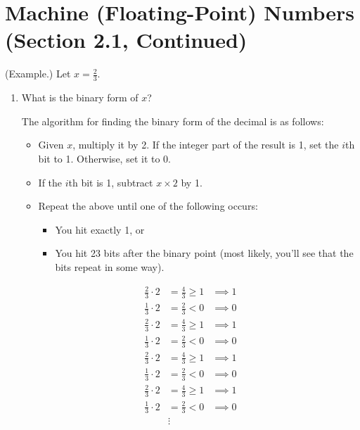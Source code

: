\documentclass[letterpaper]{article}
\begin{document}
\section{Machine (Floating-Point) Numbers (Section 2.1, Continued)}
\begin{mdframed}
    (Example.) Let $x = \frac{2}{3}$. 
    
    \begin{enumerate}[(1)]
        \item What is the binary form of $x$?
        \begin{mdframed}
            The algorithm for finding the binary form of the decimal is as follows: 
            \begin{itemize}
                \item Given $x$, multiply it by 2. If the integer part of the result is 1, set the $i$th bit to 1. Otherwise, set it to 0. 
                \item If the $i$th bit is 1, subtract $x \times 2$ by 1. 
                \item Repeat the above until one of the following occurs: 
                \begin{itemize}
                    \item You hit exactly 1, or 
                    \item You hit 23 bits after the binary point (most likely, you'll see that the bits repeat in some way). 
                \end{itemize}
            \end{itemize}
            \[\begin{aligned}
                \frac{2}{3} \cdot 2 &= \frac{4}{3} \geq 1 &\implies 1 \\ 
                \frac{1}{3} \cdot 2 &= \frac{2}{3} < 0 &\implies 0 \\
                \frac{2}{3} \cdot 2 &= \frac{4}{3} \geq 1 &\implies 1 \\ 
                \frac{1}{3} \cdot 2 &= \frac{2}{3} < 0 &\implies 0 \\
                \frac{2}{3} \cdot 2 &= \frac{4}{3} \geq 1 &\implies 1 \\ 
                \frac{1}{3} \cdot 2 &= \frac{2}{3} < 0 &\implies 0 \\
                \frac{2}{3} \cdot 2 &= \frac{4}{3} \geq 1 &\implies 1 \\ 
                \frac{1}{3} \cdot 2 &= \frac{2}{3} < 0 &\implies 0 \\
                &\vdots

\end{aligned}\]
\end{mdframed}
\end{enumerate}
\end{mdframed}
\end{document}
